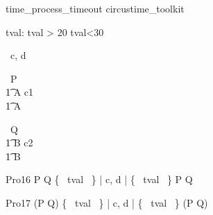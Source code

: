 \begin{zsection}
   \SECTION time\_process\_timeout \parents circustime\_toolkit
\end{zsection}


\begin{axdef}
   tval: \nat
\where
   tval > 20 \land tval<30
\end{axdef}



\begin{circus}
   \circchannel\ c, d \\
\end{circus}



\begin{circus}
    \circprocess\ P \circdef  \circbegin  \\
    \t1 A \circdef c1 \then \Skip \\
    \t1 \circspot A \\
    \circend
\end{circus}



\begin{circus}
    \circprocess\ Q \circdef  \circbegin  \\
    \t1 B \circdef c2 \then \Skip \\
    \t1 \circspot B \\
    \circend
\end{circus}



\begin{circus}
    \circprocess Pro16 \circdef P \circtimeout {} \rcirctime Q \lpar \{~ tval ~\} | \lchanset c, d \rchanset | \{~ tval ~\} \rpar P \circtimeout {} \rcirctime Q \\
\end{circus}

\begin{circus}
    \circprocess Pro17 \circdef (P \circtimeout {} \rcirctime Q) \lpar \{~ tval ~\} | \lchanset c, d \rchanset | \{~ tval ~\} \rpar (P \circtimeout {} \rcirctime Q) \\
\end{circus}



